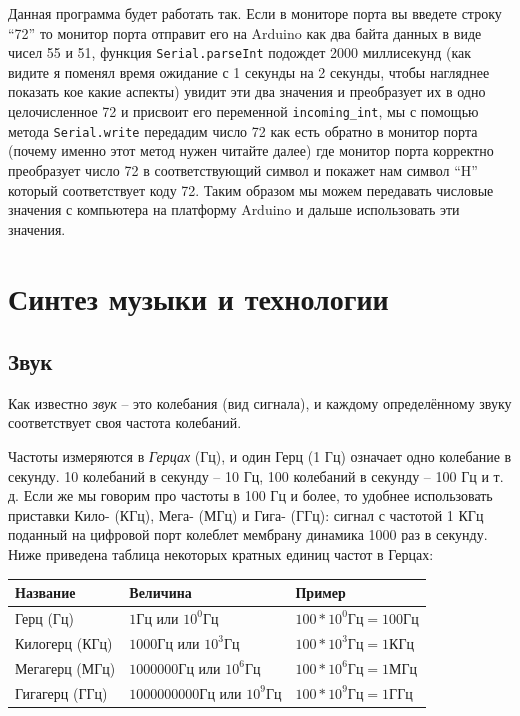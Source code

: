 \documentclass[a4paper,twoside]{book}
\begin{document}
Данная программа будет работать так. Если в мониторе порта вы введете строку
``72'' то монитор порта отправит его на Arduino как два байта данных в виде
чисел 55 и 51, функция \texttt{Serial.parseInt} подождет 2000 миллисекунд (как
видите я поменял время ожидание с 1 секунды на 2 секунды, чтобы нагляднее
показать кое какие аспекты) увидит эти два значения и преобразует их в одно
целочисленное 72 и присвоит его переменной \texttt{incoming\_int}, мы с помощью
метода \texttt{Serial.write} передадим число 72 как есть обратно в монитор порта
(почему именно этот метод нужен читайте далее) где монитор порта корректно
преобразует число 72 в соответствующий символ и покажет нам символ ``H'' который
соответствует коду 72. Таким образом мы можем передавать числовые значения с
компьютера на платформу Arduino и дальше использовать эти значения.

\chapter{Синтез музыки и технологии}

\section{Звук}

Как известно \emph{звук} -- это колебания (вид сигнала), и каждому определённому
звуку соответствует своя частота колебаний.

Частоты измеряются в \emph{Герцах} (Гц), и один Герц (1 Гц) означает одно
колебание в секунду. 10 колебаний в секунду -- 10 Гц, 100 колебаний в секунду --
100 Гц и т. д. Если же мы говорим про частоты в 100 Гц и более, то удобнее
использовать приставки Кило- (КГц), Мега- (МГц) и Гига- (ГГц): сигнал с частотой
1 КГц поданный на цифровой порт колеблет мембрану динамика 1000 раз в секунду.
Ниже приведена таблица некоторых кратных единиц частот в Герцах:

\begin{tabular}{p{3cm}|p{4cm}|p{3.5cm}}
  Название & Величина & Пример \\
  \hline \hline
  Герц (Гц)
  & $ 1 \mbox{Гц} $ или $ 10^0 \mbox{Гц} $
  & $ 100 * 10^0 \mbox{Гц} = 100 \mbox{Гц} $ \\
  \hline
  Килогерц (КГц)
  & $ 1000 \mbox{Гц} $ или $ 10^3 \mbox{Гц} $
  & $ 100 * 10^3 \mbox{Гц} = 1 \mbox{КГц} $ \\
  \hline
  Мегагерц (МГц)
  & $ 1000000 \mbox{Гц} $ или $ 10^6 \mbox{Гц} $
  & $ 100 * 10^6 \mbox{Гц} = 1 \mbox{МГц} $ \\
  \hline
  Гигагерц (ГГц)
  & $ 1000000000 \mbox{Гц} $ или $ 10^9 \mbox{Гц} $
  & $ 100 * 10^9 \mbox{Гц} = 1 \mbox{ГГц} $ \\
\end{tabular}
\end{document}

